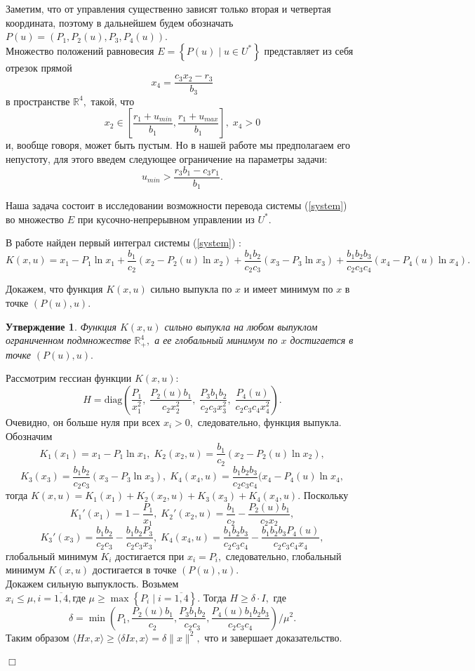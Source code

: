 \documentclass[11pt]{article}
\newtheorem{statement}{Утверждение}
\newenvironment{Proof}
{\par\noindent{\bf Доказательство.\\}} 
{\begin{flushright}$\Box$\end{flushright}}
\newcommand\Set[2]{\left\{ #1 \mid #2 \right\}}
\newcommand\Ref[1]{(\ref{#1})}
\newcommand\ftw[2]{\overline{#1,#2}}
\newcommand\RS{\Ref{system} }
\newcommand\beq{\begin{equation}}
\newcommand\eeq{\end{equation}}
\begin{document}
Заметим, что от управления существенно зависят только вторая и четвертая координата, поэтому в дальнейшем будем обозначать $P(u) = (P_1, P_2(u), P_3, P_4(u)).$ \\

Множество положений равновесия $E = \Set{P(u)}{u \in U^*}$ представляет из себя отрезок прямой 
$$x_4 = \frac{c_3x_2 - r_3}{b_3}$$ 
в пространстве $\mathbb{R}^4,$ такой, что
$$x_2 \in \left[\frac{r_1 + u_{min}}{b_1}, \frac{r_1 + u_{max}}{b_1}\right], \; x_4 > 0$$ 
 и, вообще говоря, может быть пустым. Но в нашей работе мы предполагаем его непустоту, для этого введем следующее ограничение на параметры задачи:
$$u_{min} > \frac{r_3b_1 - c_3r_1}{b_1}.$$

Наша задача состоит в исследовании возможности перевода системы \RS во множество $E$ при кусочно-непрерывном управлении из $U^*.$ 

В работе \cite{MathBio} найден первый интеграл системы \RS:
\beq
	K(x,u) = x_1 - P_1\ln x_1 + \frac{b_1}{c_2}(x_2 - P_2(u)\ln x_2) + \frac{b_1b_2}{c_2c_3}(x_3 - P_3\ln x_3) + \frac{b_1b_2b_3}{c_2c_3c_4}(x_4 - P_4(u)\ln x_4).
\eeq

Докажем, что функция $K(x,u)$ сильно выпукла по $x$ и имеет минимум по $x$ в точке $(P(u),u).$

\begin{statement}
	Функция $K(x,u)$ сильно выпукла на любом выпуклом ограниченном подмножестве $\mathbb{R}_+^4,$ а ее глобальный минимум по $x$ достигается в точке $(P(u),u).$
\end{statement}
\begin{Proof}
	Рассмотрим гессиан функции $K(x,u):$
	$$H = \text{diag} \left(\frac{P_1}{x_1^2}, \; \frac{P_2(u)b_1}{c_2x_2^2}, \; \frac{P_3b_1b_2}{c_2c_3x_3^2}, \; \frac{P_4(u)}{c_2c_3c_4x_4^2}\right).$$
	Очевидно, он больше нуля при всех $x_i > 0,$ следовательно, функция выпукла.\\
	Обозначим 
	$$K_1(x_1) = x_1 - P_1\ln x_1, \; K_2(x_2,u) = \frac{b_1}{c_2}(x_2 - P_2(u)\ln x_2),$$
	$$K_3(x_3) = \frac{b_1b_2}{c_2c_3}(x_3 - P_3\ln x_3), \; K_4(x_4,u) = \frac{b_1b_2b_3}{c_2c_3c_4}(x_4 - P_4(u)\ln x_4,$$ тогда $K(x,u) =  K_1(x_1) + K_2(x_2,u) + K_3(x_3) + K_4(x_4,u).$  Поскольку 
	$$K_1'(x_1) = 1 - \frac{P_1}{x_1}, \; K_2'(x_2,u) = \frac{b_1}{c_2} - \frac{P_2(u)b_1}{c_2x_2},$$
	$$K_3'(x_3) = \frac{b_1b_2}{c_2c_3} - \frac{b_1b_2P_3}{c_2c_3x_3}, \; K_4(x_4,u) = \frac{b_1b_2b_3}{c_2c_3c_4} - \frac{b_1b_2b_3P_4(u)}{c_2c_3c_4x_4},$$ 
	глобальный минимум $K_i$ достигается при $x_i = P_i,$ следовательно, глобальный минимум $K(x,u)$ достигается в точке $(P(u),u).$ \\
	 Докажем сильную выпуклость. Возьмем $x_i \leqslant \mu, i = \ftw{1}{4}, \text{где } \mu \geqslant \max\Set{P_i}{i = \ftw{1}{4}}.$ Тогда $H \geqslant \delta\cdot I,$ где  
	 $$\delta = \min\left(P_1, \frac{P_2(u)b_1}{c_2}, \frac{P_3b_1b_2}{c_2c_3}, \frac{P_4(u)b_1b_2b_3}{c_2c_3c_4}\right)/\mu^2.$$
	 Таким образом $\langle Hx,x \rangle \geqslant \langle \delta Ix,x \rangle = \delta \|x\|^2,$ что и завершает доказательство.
\end{Proof}
\end{document}
